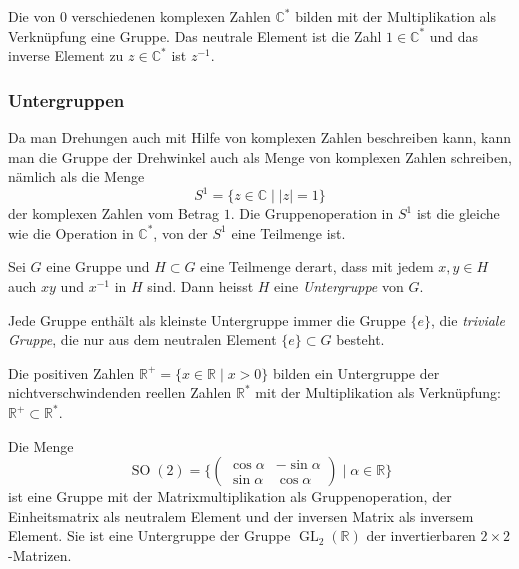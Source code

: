 \begin{beispiel}
Die von $0$ verschiedenen komplexen Zahlen $\mathbb{C}^*$ bilden mit
der Multiplikation als Verknüpfung eine Gruppe.
Das neutrale Element ist die Zahl $1\in\mathbb{C}^*$ und das inverse
Element zu $z\in\mathbb{C}^*$ ist $z^{-1}$.
\end{beispiel}

%
%
\subsubsection{Untergruppen}
Da man Drehungen auch mit Hilfe von komplexen Zahlen beschreiben kann,
kann man die Gruppe der Drehwinkel auch als Menge von komplexen Zahlen
schreiben, nämlich als die Menge
\[
S^1
=
\{z\in\mathbb{C}\mid |z|=1\}
\]
der komplexen Zahlen vom Betrag $1$.
Die Gruppenoperation in $S^1$ ist die gleiche wie die Operation
in $\mathbb{C}^*$, von der $S^1$ eine Teilmenge ist.

\begin{definition}[Untergruppe]
\label{buch:gruppen:definition:def:untergruppe}
Sei $G$ eine Gruppe und $H\subset G$ eine Teilmenge derart,
dass mit jedem $x,y\in H$ auch $xy$ und $x^{-1}$ in $H$ sind.
Dann heisst $H$ eine {\em Untergruppe} von $G$.
%
\end{definition}

Jede Gruppe enthält als kleinste Untergruppe immer die Gruppe $\{e\}$,
die {\em triviale Gruppe}, die nur aus dem neutralen Element
$\{e\}\subset G$ besteht.

\begin{beispiel}
Die positiven Zahlen $\mathbb{R}^+ = \{x\in \mathbb{R}\mid x>0\}$ 
bilden ein Untergruppe der nichtverschwindenden reellen Zahlen
$\mathbb{R}^*$ mit der Multiplikation als Verknüpfung:
$\mathbb{R}^+\subset\mathbb{R}^*$.
\end{beispiel}

\begin{beispiel}
\label{buch:gruppen:definition:bsp:so2}
Die Menge
\[
\operatorname{SO}(2)
=
\biggl\{
\begin{pmatrix}
\cos\alpha & -\sin\alpha \\
\sin\alpha &  \cos\alpha
\end{pmatrix}
\;
\bigg|
\;
\alpha\in\mathbb{R}
\biggr\}
\]
ist eine Gruppe mit der Matrixmultiplikation als Gruppenoperation,
der Einheitsmatrix als neutralem Element und der inversen Matrix
als inversem Element.
Sie ist eine Untergruppe der Gruppe $\operatorname{GL}_2(\mathbb{R})$
der invertierbaren $2\times 2$-Matrizen.
\end{beispiel}

